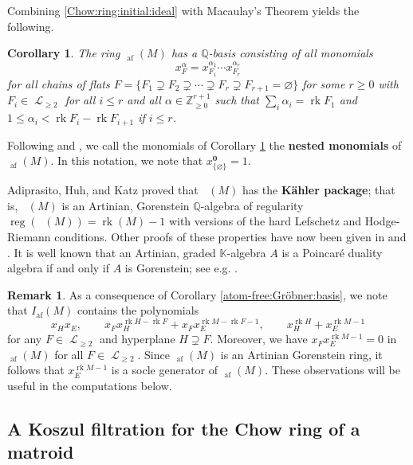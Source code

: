 \documentclass[11pt, reqno]{amsart}
\DeclareMathOperator{\atomfree}{af}
\newcommand{\af}{{\atomfree}}
\DeclareMathOperator{\Chow}{\underline{CH}}		%
\renewcommand{\emptyset}{\varnothing}
\newcommand{\kk}{\mathbb{K}}					%
\DeclareMathOperator{\LL}{\mathcal{L}}
\newcommand{\QQ}{\mathbb{Q}}
\DeclareMathOperator{\reg}{reg}					%
\DeclareMathOperator{\rk}{rk}
\newcommand{\term}[1]{\textbf{\textsf{#1}}}
\newcommand{\ZZ}{\mathbb{Z}}
\newtheorem{cor}[thm]{Corollary}
\theoremstyle{definition}
\newtheorem{rmk}[thm]{Remark}
\numberwithin{equation}{section}
\numberwithin{table}{section}
\begin{document}
\begin{spacing}{1.1}
Combining \eqref{Chow:ring:initial:ideal} with Macaulay's Theorem yields the following.

\begin{cor} \label{monomial:basis}
The ring $\Chow_{\mathrm{af}}(M)$ has a $\QQ$-basis consisting of all monomials
\[ x_F^\alpha = x_{F_1}^{\alpha_1} \cdots x_{F_r}^{\alpha_r} \]
for all chains of flats $F = \{F_1 \supsetneq F_2 \supsetneq \cdots \supsetneq F_r \supsetneq F_{r+1} = \emptyset \}$ for some $r \geq 0$ with $F_i \in \LL_{\geq 2}$ for all $i \leq r$ and all $\alpha \in \ZZ_{\geq 0}^{r+1}$ such that $\sum_i \alpha_i = \rk F_1$ and $1 \leq \alpha_i < \rk F_i - \rk F_{i + 1}$ if $i \leq r$.
\end{cor}

\noindent Following \cite{FY04} and \cite{BES20}, we call the monomials of Corollary \ref{monomial:basis} the \term{nested monomials} of $\Chow_\af(M)$.  In this notation, we note that $x_{\{\emptyset\}}^{\mathbf{0}} = 1$.


Adiprasito, Huh, and Katz \cite{AHK18} proved that $\Chow(M)$ has the \term{K\"ahler package}; that is, $\Chow(M)$ is an Artinian, Gorenstein $\mathbb{Q}$-algebra of regularity $\reg(\Chow(M)) = \rk(M) - 1$ with versions of the hard Lefschetz and Hodge-Riemann conditions.  Other proofs of these properties have now been given in \cite{BES20} and \cite{BHMPW20a}.   It is well known that an Artinian, graded $\kk$-algebra $A$ is a Poincar\'e duality algebra if and only if $A$ is Gorenstein; see e.g. \cite[Proposition 2.1]{MW09}.   

\begin{rmk} \label{socle:generator}
As a consequence of Corollary \ref{atom-free:Gröbner:basis}, we note that $I_{\mathrm{af}}(M)$ contains the polynomials
\begin{equation} \label{hyperplane:relations}
x_Hx_E, \qquad x_Fx_H^{\rk H - \rk F} + x_Fx_E^{\rk M - \rk F - 1}, \qquad x_H^{\rk H} + x_E^{\rk M -1}
\end{equation}
for any $F \in \LL_{\geq 2}$ and hyperplane $H \supsetneq F$.  Moreover, we have $x_Fx_E^{\rk M - 1} = 0$ in $\Chow_\af(M)$ for all $F \in \LL_{\geq 2}$.  Since $\Chow_\af(M)$ is an Artinian Gorenstein ring, it follows that $x_E^{\rk M - 1}$ is a socle generator of $\Chow_\af(M)$.  These observations will be useful in the computations below.
\end{rmk}

\subsection{A Koszul filtration for the Chow ring of a matroid}\label{SSfilt1}


\end{spacing}
\end{document}
